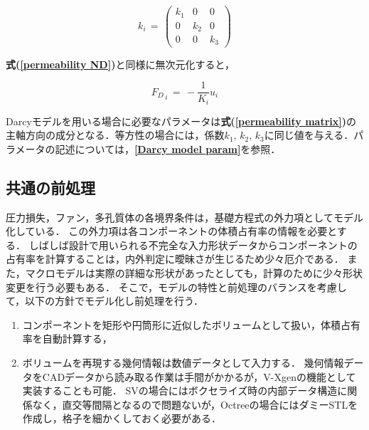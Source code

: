 \begin{equation}
k_{i} \,=\, 
\begin{pmatrix}
k_{1} & 0 & 0\\
0 & k_{2} & 0\\
0 & 0 & k_{3}
\end{pmatrix}
\label{permeability matrix}
\end{equation}

\textbf{式(\ref{permeability ND})}と同様に無次元化すると，

\begin{equation}
{F_{D}}_{\,i} \,=\, - \frac{1}{K_{i}} {u_{i}}
\label{NS_darcy aniso ND}
\end{equation}

Darcyモデルを用いる場合に必要なパラメータは\textbf{式(\ref{permeability matrix})}の主軸方向の成分となる．等方性の場合には，係数$k_{1},\,k_{2},\,k_{3}$に同じ値を与える．パラメータの記述については，\textbf{\ref{Darcy model param}}を参照．


%
\subsection{共通の前処理}
圧力損失，ファン，多孔質体の各境界条件は，基礎方程式の外力項としてモデル化している．
この外力項は各コンポーネントの体積占有率の情報を必要とする．
しばしば設計で用いられる不完全な入力形状データからコンポーネントの占有率を計算することは，内外判定に曖昧さが生じるため少々厄介である．
また，マクロモデルは実際の詳細な形状があったとしても，計算のために少々形状変更を行う必要もある．
そこで，モデルの特性と前処理のバランスを考慮して，以下の方針でモデル化し前処理を行う．

\begin{enumerate}
\item コンポーネントを矩形や円筒形に近似したボリュームとして扱い，体積占有率を自動計算する，
\vspace{2mm}

\item ボリュームを再現する幾何情報は数値データとして入力する．
幾何情報データをCADデータから読み取る作業は手間がかかるが，V-Xgenの機能として実装することも可能．
SVの場合にはボクセライズ時の内部データ構造に関係なく，直交等間隔となるので問題ないが，Octreeの場合にはダミーSTLを作成し，格子を細かくしておく必要がある．
\end{enumerate}

%
